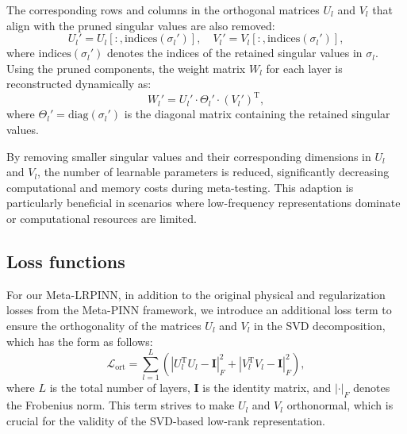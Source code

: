 The corresponding rows and columns in the orthogonal matrices $U_l$ and $V_l$ that align with the pruned singular values are also removed:
\begin{equation}\label{eq20}
U_l' = U_l[:, \text{indices}(\sigma_l')], \quad V_l' = V_l[:, \text{indices}(\sigma_l')],
\end{equation}
where $\text{indices}(\sigma_l')$ denotes the indices of the retained singular values in $\sigma_l$. Using the pruned components, the weight matrix $W_l$ for each layer is reconstructed dynamically as:
\begin{equation}\label{eq21}
W_l' = U_l' \cdot \Theta_l' \cdot (V_l')^\text{T},
\end{equation}
where $\Theta_l' = \text{diag}(\sigma_l')$ is the diagonal matrix containing the retained singular values. 

By removing smaller singular values and their corresponding dimensions in $U_l$ and $V_l$, the number of learnable parameters is reduced, significantly decreasing computational and memory costs during meta-testing. This adaption is particularly beneficial in scenarios where low-frequency representations dominate or computational resources are limited.

\subsection{Loss functions}
For our Meta-LRPINN, in addition to the original physical and regularization losses from the Meta-PINN framework, we introduce an additional loss term to ensure the orthogonality of the matrices $U_l$ and $V_l$ in the SVD decomposition, which has the form as follows: 
\begin{equation}\label{eq22} 
\mathcal{L}_{\text{ort}} = \sum_{l=1}^L \left( |U_l^\text{T} U_l - \mathbf{I}|_F^2 + |V_l^\text{T} V_l - \mathbf{I}|_F^2 \right), 
\end{equation} 
where $L$ is the total number of layers, $\mathbf{I}$ is the identity matrix, and $|\cdot|_F$ denotes the Frobenius norm. This term strives to make $U_l$ and $V_l$ orthonormal, which is crucial for the validity of the SVD-based low-rank representation. 

